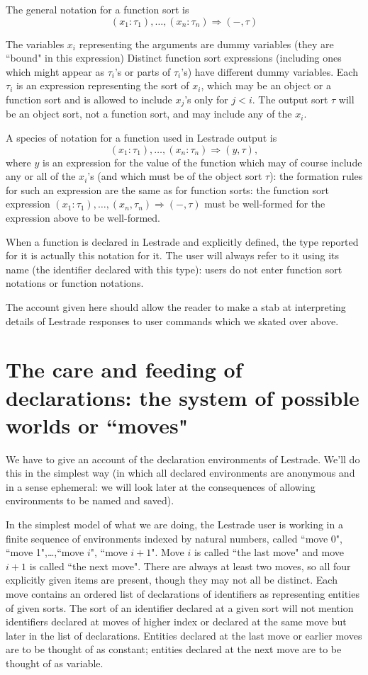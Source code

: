 \documentclass[12pt]{article}
\begin{document}
The general notation for a function sort is $$(x_1:\tau_1),\ldots,(x_n:\tau_n) \Rightarrow (-,\tau)$$

The variables $x_i$ representing the arguments are dummy variables (they are ``bound" in this expression)  Distinct function sort expressions (including ones which might appear as $\tau_i$'s or parts of $\tau_i$'s) have different dummy variables.  Each $\tau_i$ is an expression representing the sort of $x_i$, which may be an object or a function sort and  is allowed to include $x_j$'s only for $j<i$.  The output sort $\tau$ will be an object sort, not a function sort, and may include any of the $x_i$.

A species of notation for a function used in Lestrade output is $$(x_1:\tau_1),\ldots,(x_n:\tau_n) \Rightarrow (y,\tau),$$ where $y$ is an expression for the value of the function which may of course include any or all of the $x_i$'s (and which must be of the object sort $\tau$):  the formation rules for such an expression are the same as for function sorts:  the function sort expression $(x_1:\tau_1),\ldots,(x_n,\tau_n) \Rightarrow (-,\tau)$  must be well-formed for the expression above to be well-formed.

When a function is declared in Lestrade and explicitly defined, the type reported for it is actually this notation for it.  The user will always refer to it using its name (the identifier declared with this type):  users do not enter function sort notations or function notations.

The account given here should allow the reader to make a stab at interpreting details of Lestrade responses to user commands which we skated over above.

\section{The care and feeding of declarations:  the system of possible worlds or ``moves"}

We have to give an account of the declaration environments of Lestrade.  We'll do this in the simplest way (in which all declared environments are anonymous and in a sense ephemeral:  we will look later at the consequences of allowing environments to be named and saved).

In the simplest model of what we are doing, the Lestrade user is working in a finite sequence of environments indexed by natural numbers, called
``move 0", ``move 1",\ldots,``move $i$", ``move $i+1$".   Move $i$ is called ``the last move" and move $i+1$ is called ``the next move".  There are always at least two moves, so all four explicitly given items are present, though they may not all be distinct.  Each move contains an ordered list of declarations of identifiers as representing entities of given sorts.  The sort of an identifier declared at a given sort will not mention identifiers declared at moves of higher index or declared at the same move but later in the list of declarations.  Entities declared at the last move or earlier moves are to be thought of as constant;
entities declared at the next move are to be thought of as variable.
\end{document}
